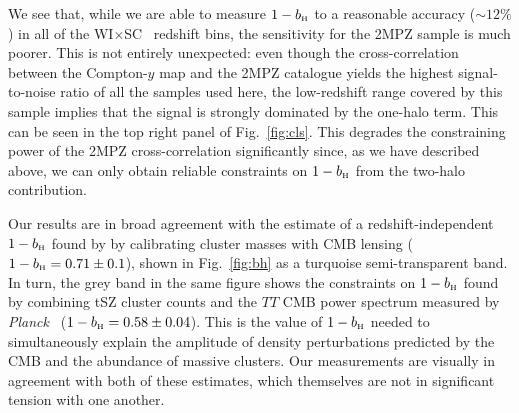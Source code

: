 \documentclass[useAMS,usenatbib]{mn2e}
\newcommand{\wisc}{WI$\times$SC}
\def\bH{b_{\scriptscriptstyle\rm H}}
\def\planck{{\it Planck\/}}
\begin{document}
      We see that, while we are able to measure $1-\bH$ to a reasonable accuracy ($\sim12\%$) in all of the \wisc~ redshift bins, the sensitivity for the 2MPZ sample is much poorer. This is not entirely unexpected: even though the cross-correlation between the Compton-$y$ map and the 2MPZ catalogue yields the highest signal-to-noise ratio of all the samples used here, the low-redshift range covered by this sample implies that the signal is strongly dominated by the one-halo term. This can be seen in the top right panel of Fig.\!~\ref{fig:cls}. This degrades the constraining power of the 2MPZ cross-correlation significantly since, as we have described above, we can only obtain reliable constraints on $1-\bH$ from the two-halo contribution.
            
      Our results are in broad agreement with the estimate of a redshift-independent $1-\bH$ found by \cite{2019arXiv190407887Z} by calibrating cluster masses with CMB lensing ($1-\bH=0.71\pm0.1$), shown in Fig.\!~\ref{fig:bh} as a turquoise semi-transparent band. In turn, the grey band in the same figure shows the constraints on $1-\bH$ found by combining tSZ cluster counts and the $TT$ CMB power spectrum measured by \planck\ \citep{2016A&A...594A..24P} ($1-\bH=0.58\pm0.04$). This is the value of $1-\bH$ needed to simultaneously explain the amplitude of density perturbations predicted by the CMB and the abundance of massive clusters. Our measurements are visually in agreement with both of these estimates, which themselves are not in significant tension with one another.
      
\end{document}

